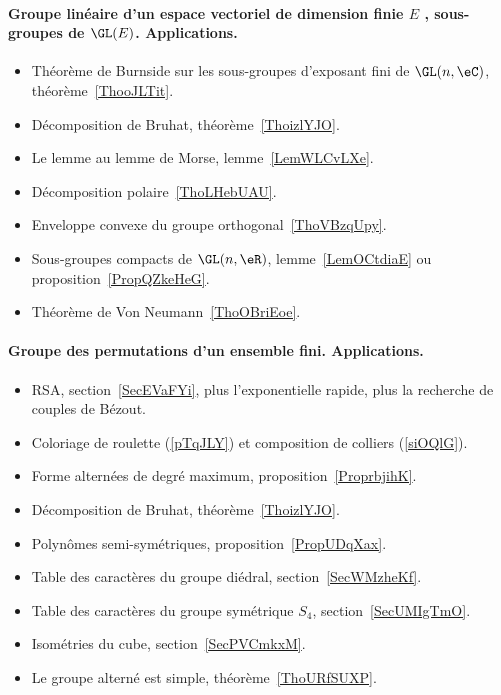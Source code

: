 \paragraph{Groupe linéaire d’un espace vectoriel de dimension finie $E$ , sous-groupes de $\GL(E)$. Applications.}
\begin{itemize}
    \item Théorème de Burnside sur les sous-groupes d'exposant fini de \( \GL(n,\eC)\), théorème~\ref{ThooJLTit}.
    \item Décomposition de Bruhat, théorème~\ref{ThoizlYJO}.
    \item Le lemme au lemme de Morse, lemme~\ref{LemWLCvLXe}.
    \item Décomposition polaire~\ref{ThoLHebUAU}.
    \item Enveloppe convexe du groupe orthogonal~\ref{ThoVBzqUpy}.
    \item Sous-groupes compacts de \( \GL(n,\eR)\), lemme~\ref{LemOCtdiaE} ou proposition~\ref{PropQZkeHeG}.
    \item Théorème de Von Neumann~\ref{ThoOBriEoe}.
\end{itemize}
\paragraph{Groupe des permutations d'un ensemble fini. Applications.}
\begin{itemize}
    \item RSA, section~\ref{SecEVaFYi}, plus l'exponentielle rapide, plus la recherche de couples de Bézout.
    \item Coloriage de roulette (\ref{pTqJLY}) et composition de colliers (\ref{siOQlG}).
    \item Forme alternées de degré maximum, proposition~\ref{ProprbjihK}.
    \item Décomposition de Bruhat, théorème~\ref{ThoizlYJO}.
    \item Polynômes semi-symétriques, proposition~\ref{PropUDqXax}.
    \item Table des caractères du groupe diédral, section~\ref{SecWMzheKf}.
    \item Table des caractères du groupe symétrique \( S_4\), section~\ref{SecUMIgTmO}.
    \item Isométries du cube, section~\ref{SecPVCmkxM}.
    \item Le groupe alterné est simple, théorème~\ref{ThoURfSUXP}.
\end{itemize}
